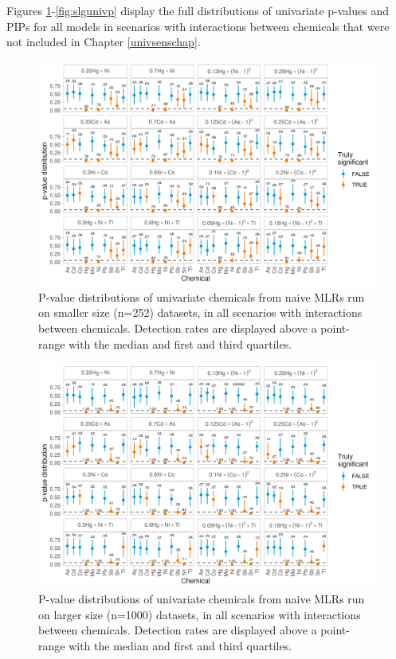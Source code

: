 \documentclass[12pt, twoside]{amherstthesis}
\begin{document}
Figures \ref{fig:nsmunivp}-\ref{fig:slgunivp} display the full distributions of univariate p-values and PIPs for all models in scenarios with interactions between chemicals that were not included in Chapter \ref{univsenschap}.
\begin{figure}

{\centering \includegraphics[width=0.85\linewidth]{figures/ch4_nsm_univ_pval} 

}

\caption{P-value distributions of univariate chemicals from naive MLRs run on smaller size (n=252) datasets, in all scenarios with interactions between chemicals. Detection rates are displayed above a point-range with the median and first and third quartiles.}\label{fig:nsmunivp}
\end{figure}
\begin{figure}

{\centering \includegraphics[width=0.85\linewidth]{figures/ch4_nlg_univ_pval} 

}

\caption{P-value distributions of univariate chemicals from naive MLRs run on larger size (n=1000) datasets, in all scenarios with interactions between chemicals. Detection rates are displayed above a point-range with the median and first and third quartiles.}\label{fig:nlgunivp}
\end{figure}
\end{document}
